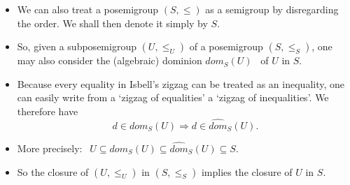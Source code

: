 \documentclass[notes=show]{beamer}
\makeatletter
\newenvironment{stepitemize}{\begin{itemize}[<+->]}{\end{itemize} }
\newenvironment{stepitemizewithalert}{\begin{itemize}[<+-| alert@+>]}{\end{itemize} }
\makeatother
\begin{document}
\begin{frame}%


\begin{stepitemize}
\item We can also treat a posemigroup $(S,\leq )$ as a semigroup by
disregarding the order. We shall then denote it simply by $S$.\bigskip

\item So, given a subposemigroup $(U,\leq _{U})$ of a posemigroup $(S,\leq
_{S})$, one may also consider the (algebraic) dominion $dom_{S}(U)$%
{\normalsize \ }of $U$ in $S$.\bigskip

\item Because every equality in Isbell's zigzag can be treated as an
inequality, one can easily write from a `zigzag of equalities' a `zigzag of
inequalities'. We therefore have%
\begin{equation*}
d\in dom_{S}(U)\Longrightarrow d\in \widehat{dom}_{S}(U).
\end{equation*}%
\smallskip 

\item More precisely: $\ \ U\subseteq dom_{S}(U)\subseteq \widehat{dom}%
_{S}(U)\subseteq S$.\bigskip 
\end{stepitemize}

\begin{stepitemizewithalert}
\item So the closure of $(U,\leq _{U})$ in $(S,\leq _{S})$ implies the
closure of $U$ in $S$.
\end{stepitemizewithalert}

\transboxout%
\end{frame}%
\end{document}
